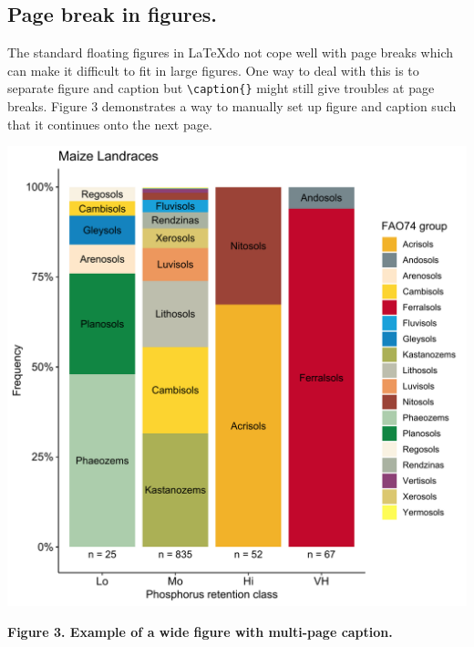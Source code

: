 \documentclass[10pt,letterpaper]{article}
\begin{document}
\subsection*{Page break in figures.}
The standard floating figures in \LaTeX do not cope well with page breaks which can make it difficult to fit in large figures. One way to deal with this is to separate figure and caption but \verb!\caption{}! might still give troubles at page breaks. Figure 3 demonstrates a way to manually set up figure and caption such that it continues onto the next page.
\vspace{.5cm} %
\begin{adjustwidth}{-2in}{0in}
\begin{flushright}
\includegraphics[width=163mm]{fig3.pdf}
\end{flushright}
\justify 
\color{Gray}
\textbf {Figure 3. Example of a wide figure with multi-page caption.}

\end{adjustwidth}
\end{document}
